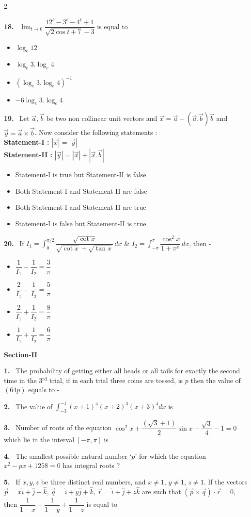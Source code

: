 \documentclass[10pt]{extarticle}
\newcommand{\sect}[1]{\par\smallskip\noindent\textbf{#1}\par}
\newcommand{\qn}[1]{\par\smallskip\noindent\textbf{#1.}~}
\newenvironment{qoptions}{\begin{itemize}[leftmargin=1.8em,itemsep=1pt,topsep=2pt,label={}]}{\end{itemize}}
\newcommand{\opt}[2]{\item[(#1)] #2}
\begin{document}
\begin{multicols}{2}
\qn{18} $\displaystyle\lim_{t\to0}\dfrac{12^t-3^t-4^t+1}{\sqrt{2\cos t+7}-3}$ is equal to
\begin{qoptions}
\opt{A}{$\log_e12$}
\opt{B}{$\log_e3.\log_e4$}
\opt{C}{$\left(\log_e3.\log_e4\right)^{-1}$}
\opt{D}{$-6\log_e3.\log_e4$}
\end{qoptions}

\qn{19} Let $\vec a,\vec b$ be two non collinear unit vectors and $\vec x=\vec a-\left(\vec a.\vec b\right)\vec b$ and $\vec y=\vec a\times\vec b$. Now consider the following statements :\\
\textbf{Statement-I :} $|\vec x|=|\vec y|$\\
\textbf{Statement-II :} $|\vec y|=|\vec x|+\left|\vec x.\vec b\right|$
\begin{qoptions}
\opt{A}{Statement-I is true but Statement-II is false}
\opt{B}{Both Statement-I and Statement-II are false}
\opt{C}{Both Statement-I and Statement-II are true}
\opt{D}{Statement-I is false but Statement-II is true}
\end{qoptions}

\qn{20} If $I_1=\displaystyle\int_0^{\pi/2}\dfrac{\sqrt{\cot x}}{\sqrt{\cot x}+\sqrt{\tan x}}\,dx$ \& $I_2=\displaystyle\int_{-\pi}^{\pi}\dfrac{\cos^2x}{1+\pi^x}\,dx$, then -
\begin{qoptions}
\opt{A}{$\dfrac1{I_1}-\dfrac1{I_2}=\dfrac3\pi$}
\opt{B}{$\dfrac2{I_1}-\dfrac1{I_2}=\dfrac5\pi$}
\opt{C}{$\dfrac2{I_1}+\dfrac1{I_2}=\dfrac8\pi$}
\opt{D}{$\dfrac1{I_1}+\dfrac1{I_2}=\dfrac6\pi$}
\end{qoptions}

\sect{Section-II}

\qn{1} The probability of getting either all heads or all tails for exactly the second time in the 3$^{\text{rd}}$ trial, if in each trial three coins are tossed, is $p$ then the value of $(64p)$ equals to -

\qn{2} The value of $\displaystyle\int_{-3}^{-1}(x+1)^4(x+2)^3(x+3)^4dx$ is

\qn{3} Number of roots of the equation $\cos^2x+\dfrac{\left(\sqrt3+1\right)}{2}\sin x-\dfrac{\sqrt3}4-1=0$ which lie in the interval $[-\pi,\pi]$ is

\qn{4} The smallest possible natural number `$p$' for which the equation $x^2-px+1258=0$ has integral roots ?

\qn{5} If $x,y,z$ be three distinct real numbers, and $x\neq1$, $y\neq1$, $z\neq1$. If the vectors $\vec p=x\hat i+\hat j+\hat k$, $\vec q=\hat i+y\hat j+\hat k$, $\vec r=\hat i+\hat j+z\hat k$ are such that $(\vec p\times\vec q)\cdot\vec r=0$, then $\dfrac1{1-x}+\dfrac1{1-y}+\dfrac1{1-z}$ is equal to

\end{multicols}
\end{document}
